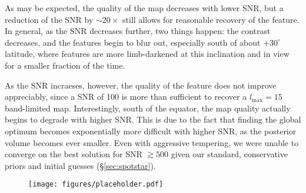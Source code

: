 \documentclass[modern]{aastex62}
\begin{document}
As may be expected, the quality of the map decreases with lower SNR, but
a reduction of the SNR by $\sim 20\times$ still allows for reasonable
recovery of the \spot feature. In general, as the SNR decreases further,
two things happen: the \spot contrast decreases, and the features begin to
blur out, especially south of about $+30^\circ$ latitude, where features
are more limb-darkened
at this inclination and in view for a smaller fraction of the time.

As the SNR incraeses, however, the quality of the \spot feature does not
improve appreciably, since a SNR of 100 is more than sufficient to recover
a $l_\mathrm{max} = 15$ band-limited map. Interestingly, south of the equator,
the map quality actually begins to degrade with higher SNR. This is due to
the fact that finding the global optimum becomes exponentially more difficult
with higher SNR, as the posterior volume becomes ever smaller. Even with
aggressive tempering, we were unable to converge on the best solution for
SNR $\gtrsim 500$ given our standard, conservative priors and initial
guesses (\S\ref{sec:spotstar}).
%
\begin{figure}[p!]
    \begin{centering}
        \texttt{[image: figures/placeholder.pdf]} %
    \end{centering}
\end{figure}
%
\end{document}
